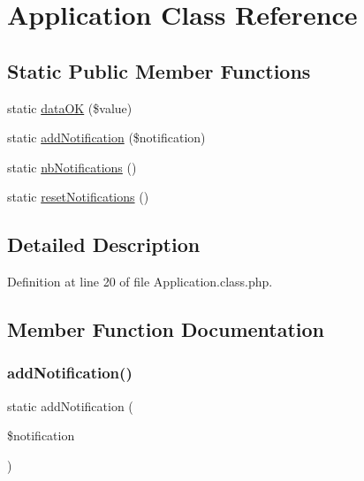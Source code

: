 \hypertarget{class_application}{}\section{Application Class Reference}
\label{class_application}
\subsection*{Static Public Member Functions}
\begin{DoxyCompactItemize}
\item 
static \hyperlink{class_application_a48315b63dbfa6a885a2de5b2576b72d4}{data\+OK} (\$value)
\item 
static \hyperlink{class_application_afe539800cd0fed94c6c2311bf500281e}{add\+Notification} (\$notification)
\item 
static \hyperlink{class_application_a1c75bfcfe281ca1155d3c5f6b99837ab}{nb\+Notifications} ()
\item 
static \hyperlink{class_application_a239b8f66e773da322df451ff13cac139}{reset\+Notifications} ()
\end{DoxyCompactItemize}


\subsection{Detailed Description}


Definition at line 20 of file Application.\+class.\+php.



\subsection{Member Function Documentation}
\mbox{\label{class_application_afe539800cd0fed94c6c2311bf500281e}} 
\subsubsection{\texorpdfstring{add\+Notification()}{addNotification()}}
{\footnotesize\ttfamily static add\+Notification (\begin{DoxyParamCaption}\item[{}]{\$notification }\end{DoxyParamCaption})\hspace{0.3cm}{\ttfamily [static]}}

